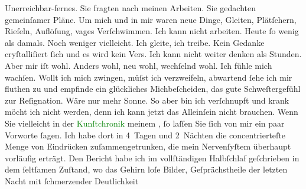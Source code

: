                Unerreichbar-fernes. Sie fragten nach meinen Arbeiten. Sie gedachten gemeinſamer
               Pläne. Um mich und in mir waren neue Dinge, Gleiten, Plätſchern, Rieſeln, Auflöſung,
               vages Verſchwimmen. Ich kann nicht arbeiten. Heute ſo wenig als damals. Noch weniger
                  {\pb}vielleicht. Ich gleite, ich
               treibe. Kein Gedanke cryſtalliſiert ſich und es wird kein Vers. Ich kann nicht weiter
               denken als Stunden.\pend
           \pstart
           Aber mir iſt wohl. Anders wohl, neu wohl, wechſelnd wohl. Ich fühle mich wachſen.
               Wollt ich mich zwingen, müſst ich verzweifeln,
               abwartend ſehe ich mir fluthen zu und empfinde ein glückliches Michbeſcheiden, das
               gute Schweſtergefühl zur Reſignation. Wäre nur mehr Sonne. So aber bin ich
               verſchnupft und krank möcht ich nicht werden, denn ich kann jetzt das Alleinſein
               nicht brauchen. Wenn Sie vielleicht in der \textcolor{green}{Kunſtchronik}{}\ledrightnote{\textcolor{green}{Allgemeine Kunst-Chronik}} meinem \label{K_L00026_2v}\label{K_L00026_2h}{ }\label{K_L00026_3v}\label{K_L00026_3h}, ſo laſſen Sie ſich von mir {\pb}ein paar Vorworte ſagen. Ich habe
               dort in 4 Tagen und 2 Nächten die concentrierteſte Menge von Eindrücken
               zuſammengetrunken, die mein Nervenſyſtem überhaupt vorläufig erträgt. Den Bericht
               habe ich im vollſtändigen Halbſchlaf geſchrieben in dem ſeltſamen Zuſtand, wo das
               Gehirn loſe Bilder, Geſprächstheile der letzten Nacht mit ſchmerzender Deutlichkeit
